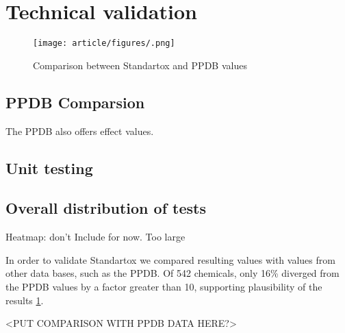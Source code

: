 
\section{Technical validation}


\begin{figure}
    \texttt{[image: article/figures/.png]}
    \caption{
        Comparison between Standartox and PPDB values
    }
    \label{fig:standartox_ppdb_diff}
\end{figure}


\subsection{PPDB Comparsion}
The PPDB also offers effect values.

\subsection{Unit testing}

\subsection{Overall distribution of tests}
Heatmap: don't Include for now. Too large


In order to validate Standartox we compared resulting values with values from other data bases, such as the PPDB. Of 542 chemicals, only 16\% diverged from the PPDB values by a factor greater than 10, supporting plausibility of the \standartox results \ref{fig:standartox_ppdb_diff}.





<PUT COMPARISON WITH PPDB DATA HERE?>